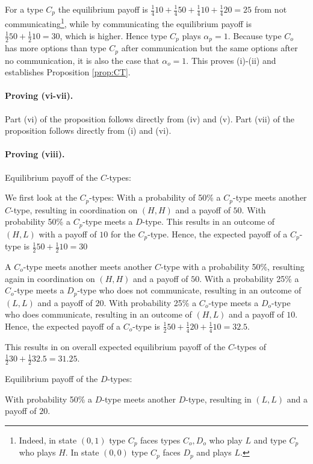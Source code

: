 \documentclass[12pt]{article}
\theoremstyle{break}
\begin{document}
For a type $C_p$ the equilibrium payoff is $ \frac{1}{4}10+\frac{1}{4}50+\frac{1}{4}10+\frac{1}{4}20=25$ from not communicating\footnote{
Indeed, in state $(0,1)$ type $C_p$ faces types $C_o,D_o$ who play $L$ and type $C_p$ who plays $H$. In state $(0,0)$ type $C_p$ faces $D_p$ and plays $L$.
}, while by communicating the equilibrium payoff is $\frac{1}{2}50+\frac{1}{2}10=30$, which is higher. Hence type $C_p$ plays $\alpha_p=1$. Because type $C_o$ has more options than type $C_p$ after communication but the same options after no communication, it is also the case that $\alpha_o=1$. This proves (i)-(ii) and establishes Proposition \ref{prop:CT}.

\paragraph{Proving (vi-vii).} Part (vi) of the proposition follows directly from (iv) and (v).
Part (vii) of the proposition follows directly from (i) and (vi).

\paragraph{Proving (viii).} 
Equilibrium payoff of the $C$-types:

We first look at the $C_p$-types: With a probability of 50\% a $C_p$-type meets another $C$-type, resulting in coordination on $(H,H)$ and a payoff of $50$. With probability 50\% a $C_p$-type meets a $D$-type. This results in an outcome of $(H,L)$ with a payoff of $10$ for the $C_p$-type. Hence, the expected payoff of a $C_p$-type is 
$\frac{1}{2}50+\frac{1}{2}10=30$

A $C_o$-type meets another meets another $C$-type with a probability 50\%, resulting again in coordination on $(H,H)$ and a payoff of $50$. With a probability 25\% a $C_o$-type meets a $D_p$-type who does not communicate, resulting in an outcome of $(L,L)$ and a payoff of $20$. With probability 25\% a $C_o$-type meets a $D_o$-type who does communicate, resulting in an outcome of $(H,L)$ and a payoff of $10$. Hence, the expected payoff of a $C_o$-type is 
$\frac{1}{2}50+\frac{1}{4}20+\frac{1}{4}10=32.5$.

This results in on overall expected equilibrium payoff of the $C$-types of $\frac{1}{2}30+\frac{1}{2}32.5=31.25$.

Equilibrium payoff of the $D$-types:

With probability 50\% a $D$-type meets another $D$-type, resulting in $(L,L)$ and a payoff of $20$.
\end{document}
